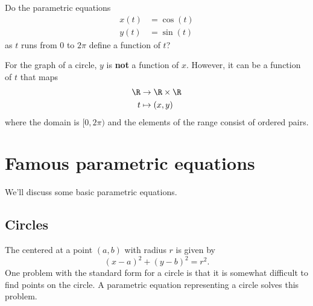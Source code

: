 \documentclass{ximera}
\begin{document}
\begin{question}
  Do the parametric equations
  \begin{align*}
    x(t) &= \cos(t)\\
    y(t) &= \sin(t)
  \end{align*}
  as $t$ runs from $0$ to $2\pi$ define a function of $t$?
  \begin{multipleChoice}
  \end{multipleChoice}
  \begin{feedback}
    For the graph of a circle, $y$ is \textbf{not} a function of
    $x$. However, it can be a function of $t$ that maps
    \begin{align*}
    \R &\to \R\times \R\\
    t &\mapsto (x,y)
    \end{align*}
    where the domain is $[0,2\pi)$ and the elements of the range
      consist of ordered pairs.
  \end{feedback}
\end{question}


\section{Famous parametric equations}

We'll discuss some basic parametric equations.


\subsection{Circles}

The  centered at a point $(a,b)$ with
radius $r$ is given by
\[
(x-a)^2 + (y-b)^2 = r^2.
\]
One problem with the standard form for a circle is that it is somewhat
difficult to find points on the circle. A parametric equation
representing a circle solves this problem.
\end{document}
